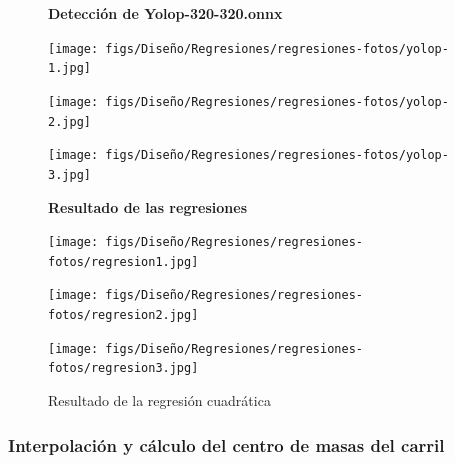 \begin{figure}[H]
  \centering
  \textbf{Detección de Yolop-320-320.onnx}
  \vspace{0.5cm}

  \begin{minipage}[t]{0.3\textwidth}
      \centering
      \texttt{[image: figs/Diseño/Regresiones/regresiones-fotos/yolop-1.jpg]}
      \caption*{}
  \end{minipage}
  \hfill
  \begin{minipage}[t]{0.3\textwidth}
      \centering
      \texttt{[image: figs/Diseño/Regresiones/regresiones-fotos/yolop-2.jpg]}
      \caption*{}
  \end{minipage}
  \hfill
  \begin{minipage}[t]{0.3\textwidth}
      \centering
      \texttt{[image: figs/Diseño/Regresiones/regresiones-fotos/yolop-3.jpg]}
      \caption*{}
  \end{minipage}

  \vspace{0.5cm}

  \textbf{Resultado de las regresiones}
  \vspace{0.5cm}

  \begin{minipage}[t]{0.3\textwidth}
      \centering
      \texttt{[image: figs/Diseño/Regresiones/regresiones-fotos/regresion1.jpg]}
      \caption*{}
  \end{minipage}
  \hfill
  \begin{minipage}[t]{0.3\textwidth}
      \centering
      \texttt{[image: figs/Diseño/Regresiones/regresiones-fotos/regresion2.jpg]}
      \caption*{}
  \end{minipage}
  \hfill
  \begin{minipage}[t]{0.3\textwidth}
      \centering
      \texttt{[image: figs/Diseño/Regresiones/regresiones-fotos/regresion3.jpg]}
      \caption*{}
  \end{minipage}

  \caption{Resultado de la regresión cuadrática}
  \label{fig:regresión cuadrática}
\end{figure}


\subsubsection{Interpolación y cálculo del centro de masas del carril}
\label{sec:Interpolación y cálculo del centro de masas del carril}

